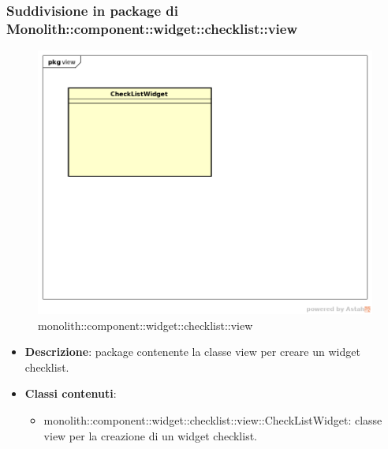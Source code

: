 \subsubsection{Suddivisione in package  di Monolith::component::widget::checklist::view}
\label{monolith::component::widget::checklist::view}
\begin{figure}[H]
	\centering
	\includegraphics[scale=0.5]{Sezioni/imgPackage/component_widget_checklist_view.png}
	\caption{monolith::component::widget::checklist::view}
\end{figure}
\begin{itemize}
	\item{\textbf{Descrizione}}: package contenente la classe view per creare un widget checklist.
	\item{\textbf{Classi contenuti}}:
	\begin{itemize}
	\item{monolith::component::widget::checklist::view::CheckListWidget}: classe view per la creazione di un widget checklist.
	\end{itemize}
\end{itemize}


